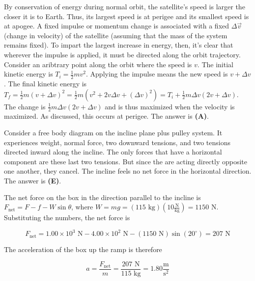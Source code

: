 \documentclass[12pt]{article}
\begin{document}

By conservation of energy during normal orbit, the satellite's speed is larger the closer it is to Earth. Thus, its largest speed is at perigee and its smallest speed is at apogee. A fixed impulse or momentum change is associated with a fixed $\Delta \vec{v}$ (change in velocity) of the satellite (assuming that the mass of the system remains fixed). To impart the largest increase in energy, then, it's clear that wherever the impulse is applied, it must be directed along the orbit trajectory. Consider an aribtrary point along the orbit where the speed is $v$. The initial kinetic energy is $T_i = \frac{1}{2} m v^2$. Applying the impulse means the new speed is $v + \Delta v$. The final kinetic energy is $T_f = \frac{1}{2} m (v + \Delta v)^2 = \frac{1}{2} m (v^2 + 2 v \Delta v + (\Delta v)^2) = T_i + \frac{1}{2} m \Delta v (2 v + \Delta v)$. The change is $\frac{1}{2} m \Delta v (2 v + \Delta v)$ and is thus maximized when the velocity is maximized. As discussed, this occurs at perigee. The answer is \textbf{(A)}.


\vspace{2 \baselineskip}



Consider a free body diagram on the incline plane plus pulley system. It experiences weight, normal force, two downward tensions, and two tensions directed inward along the incline. The only forces that have a horizontal component are these last two tensions. But since the are acting directly opposite one another, they cancel. The incline feels no net force in the horizontal direction. The answer is \textbf{(E)}.


\vspace{2 \baselineskip}



The net force on the box in the direction parallel to the incline is $F_\text{net} = F - f - W \sin \theta$, where $W = m g = (115 \text{ kg}) \left( 10 \frac{\text{N}}{\text{kg}} \right) = 1150 \text{ N}$. Substituting the numbers, the net force is

$$F_\text{net} = 1.00 \times 10^3 \text{ N} - 4.00 \times 10^2 \text{ N} - (1150 \text{ N}) \sin (20^\circ) = 207 \text{ N}$$

The acceleration of the box up the ramp is therefore

$$a = \frac{F_\text{net}}{m} = \frac{207 \text{ N}}{115 \text{ kg}} = 1.80 \frac{\text{m}}{\text{s}^2}$$
\end{document}
